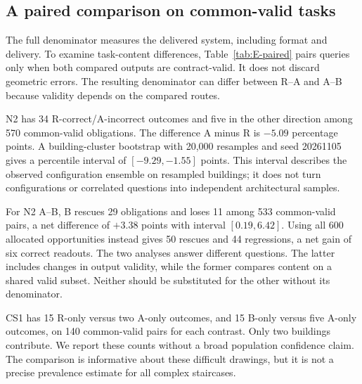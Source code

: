 \begin{table}[htbp]\centering\small

\caption{Full configuration results. v1/N2 each have 12 tasks per route, 75 determinate obligations per configuration; CS1 has two tasks and 20 obligations. A/B valid means contract-scorable, not geometrically correct.}\label{tab:E-config}
\end{table}

\subsection{A paired comparison on common-valid tasks}
The full denominator measures the delivered system, including format and delivery. To examine task-content differences, Table~\ref{tab:E-paired} pairs queries only when both compared outputs are contract-valid. It does not discard geometric errors. The resulting denominator can differ between R--A and A--B because validity depends on the compared routes.

\begin{table}[htbp]\centering\small

\caption{Common-valid paired outcomes. First-only means the first route is correct and the second is wrong or unevaluable. For R--A this is an answer-to-construction loss; for A--B, second-only is a relation-assisted rescue.}\label{tab:E-paired}
\end{table}

N2 has 34 R-correct/A-incorrect outcomes and five in the other direction among 570 common-valid obligations. The difference A minus R is $-5.09$ percentage points. A building-cluster bootstrap with 20,000 resamples and seed 20261105 gives a percentile interval of $[-9.29,-1.55]$ points. This interval describes the observed configuration ensemble on resampled buildings; it does not turn configurations or correlated questions into independent architectural samples.

For N2 A--B, B rescues 29 obligations and loses 11 among 533 common-valid pairs, a net difference of $+3.38$ points with interval $[0.19,6.42]$. Using all 600 allocated opportunities instead gives 50 rescues and 44 regressions, a net gain of six correct readouts. The two analyses answer different questions. The latter includes changes in output validity, while the former compares content on a shared valid subset. Neither should be substituted for the other without its denominator.

CS1 has 15 R-only versus two A-only outcomes, and 15 B-only versus five A-only outcomes, on 140 common-valid pairs for each contrast. Only two buildings contribute. We report these counts without a broad population confidence claim. The comparison is informative about these difficult drawings, but it is not a precise prevalence estimate for all complex staircases.

